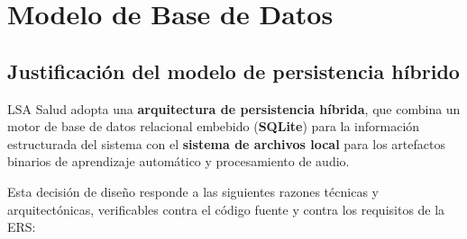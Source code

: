 \section{Modelo de Base de Datos}

\subsection{Justificación del modelo de persistencia híbrido}

LSA Salud adopta una \textbf{arquitectura de persistencia híbrida}, que combina
un motor de base de datos relacional embebido (\textbf{SQLite}) para la
información estructurada del sistema con el \textbf{sistema de archivos local}
para los artefactos binarios de aprendizaje automático y procesamiento de audio.

Esta decisión de diseño responde a las siguientes razones técnicas y
arquitectónicas, verificables contra el código fuente y contra los requisitos
de la ERS:

